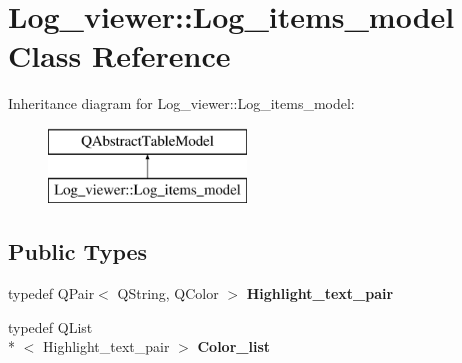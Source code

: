 \hypertarget{class_log__viewer_1_1_log__items__model}{\section{Log\-\_\-viewer\-:\-:Log\-\_\-items\-\_\-model Class Reference}
\label{class_log__viewer_1_1_log__items__model}
}
Inheritance diagram for Log\-\_\-viewer\-:\-:Log\-\_\-items\-\_\-model\-:\begin{figure}[H]
\begin{center}
\leavevmode
\includegraphics[height=2.000000cm]{class_log__viewer_1_1_log__items__model}
\end{center}
\end{figure}
\subsection*{Public Types}
\begin{DoxyCompactItemize}
\item 
\hypertarget{class_log__viewer_1_1_log__items__model_af4fa93fd2a023946a84a8e6cb913c11e}{typedef Q\-Pair$<$ Q\-String, Q\-Color $>$ {\bfseries Highlight\-\_\-text\-\_\-pair}}\label{class_log__viewer_1_1_log__items__model_af4fa93fd2a023946a84a8e6cb913c11e}

\item 
\hypertarget{class_log__viewer_1_1_log__items__model_a1775182799f950e0430d9431a2acc098}{typedef Q\-List\\*
$<$ Highlight\-\_\-text\-\_\-pair $>$ {\bfseries Color\-\_\-list}}\label{class_log__viewer_1_1_log__items__model_a1775182799f950e0430d9431a2acc098}

\end{DoxyCompactItemize}
